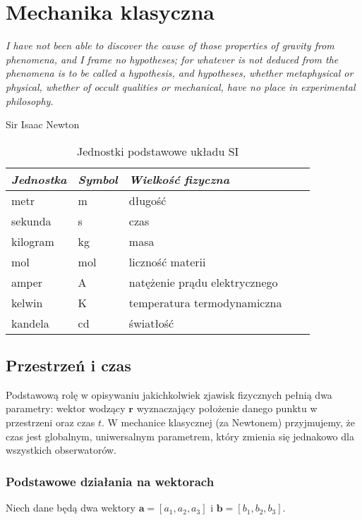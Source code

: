 \documentclass[../main.tex]{subfiles}
\begin{document}
\section{Mechanika klasyczna}
\textit{I have not been able to discover the cause of those properties of gravity from phenomena, and I frame no hypotheses; for whatever is not deduced from the phenomena is to be called a hypothesis, and hypotheses, whether metaphysical or physical, whether of occult qualities or mechanical, have no place in experimental philosophy.}\begin{flushright}Sir Isaac Newton\end{flushright}

\begin{table}[h]
    \centering
    \begin{tabular}{ *5l }\toprule
    \emph{Jednostka} & \emph{Symbol} & \emph{Wielkość fizyczna}  \\\midrule
    metr    & m  & długość   \\ 
    sekunda  & s & czas  \\ 
    kilogram  & kg & masa  \\
    mol     & mol  & liczność materii   \\ 
    amper  & A & natężenie prądu elektrycznego\\ 
    kelwin & K & temperatura termodynamiczna  \\
    kandela & cd & światłość\\
    \bottomrule
    \hline
\end{tabular}
\caption{Jednostki podstawowe układu SI}
\end{table}
\subsection{Przestrzeń i czas}
Podstawową rolę w opisywaniu jakichkolwiek zjawisk fizycznych pełnią dwa parametry: wektor wodzący \(\mathbf{r}\) wyznaczający położenie danego punktu w przestrzeni oraz czas \(t\). W mechanice klasycznej (za Newtonem) przyjmujemy, że czas jest globalnym, uniwersalnym parametrem, który zmienia się jednakowo dla wszystkich obserwatorów.
\subsubsection{Podstawowe działania na wektorach}
Niech dane będą dwa wektory \(\mathbf{a}=[a_1,a_2,a_3]\) i \(\mathbf{b}=[b_1,b_2,b_3]\).
\end{document}
